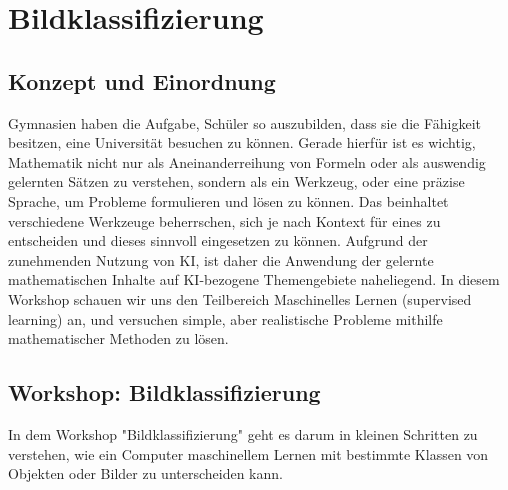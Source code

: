 
\chapter{Bildklassifizierung}

    \section{Konzept und Einordnung}
    Gymnasien haben die Aufgabe, Schüler so auszubilden, dass sie die Fähigkeit besitzen, eine Universität besuchen zu können. Gerade hierfür ist es wichtig, Mathematik nicht nur als Aneinanderreihung von Formeln oder als auswendig gelernten Sätzen zu verstehen, sondern als ein Werkzeug, oder eine präzise Sprache, um Probleme formulieren und lösen zu können. Das beinhaltet verschiedene Werkzeuge beherrschen, sich je nach Kontext für eines zu entscheiden und dieses sinnvoll eingesetzen zu können.
    Aufgrund der zunehmenden Nutzung von KI, ist daher die Anwendung der gelernte mathematischen Inhalte auf KI-bezogene Themengebiete naheliegend.
    In diesem Workshop schauen wir uns den Teilbereich Maschinelles Lernen (supervised learning) an, und versuchen simple, aber realistische Probleme mithilfe mathematischer Methoden zu lösen.

    \section{Workshop: Bildklassifizierung}
        In dem Workshop "Bildklassifizierung" geht es darum in kleinen Schritten zu verstehen, wie ein Computer maschinellem Lernen mit  bestimmte Klassen von Objekten oder Bilder zu unterscheiden kann.
